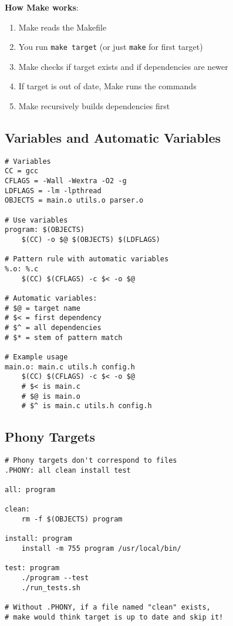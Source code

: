 \textbf{How Make works}:

\begin{enumerate}
    \item Make reads the Makefile
    \item You run \texttt{make target} (or just \texttt{make} for first target)
    \item Make checks if target exists and if dependencies are newer
    \item If target is out of date, Make runs the commands
    \item Make recursively builds dependencies first
\end{enumerate}

\subsection{Variables and Automatic Variables}

\begin{lstlisting}
# Variables
CC = gcc
CFLAGS = -Wall -Wextra -O2 -g
LDFLAGS = -lm -lpthread
OBJECTS = main.o utils.o parser.o

# Use variables
program: $(OBJECTS)
	$(CC) -o $@ $(OBJECTS) $(LDFLAGS)

# Pattern rule with automatic variables
%.o: %.c
	$(CC) $(CFLAGS) -c $< -o $@

# Automatic variables:
# $@ = target name
# $< = first dependency
# $^ = all dependencies
# $* = stem of pattern match

# Example usage
main.o: main.c utils.h config.h
	$(CC) $(CFLAGS) -c $< -o $@
	# $< is main.c
	# $@ is main.o
	# $^ is main.c utils.h config.h
\end{lstlisting}

\subsection{Phony Targets}

\begin{lstlisting}
# Phony targets don't correspond to files
.PHONY: all clean install test

all: program

clean:
	rm -f $(OBJECTS) program

install: program
	install -m 755 program /usr/local/bin/

test: program
	./program --test
	./run_tests.sh

# Without .PHONY, if a file named "clean" exists,
# make would think target is up to date and skip it!
\end{lstlisting}

